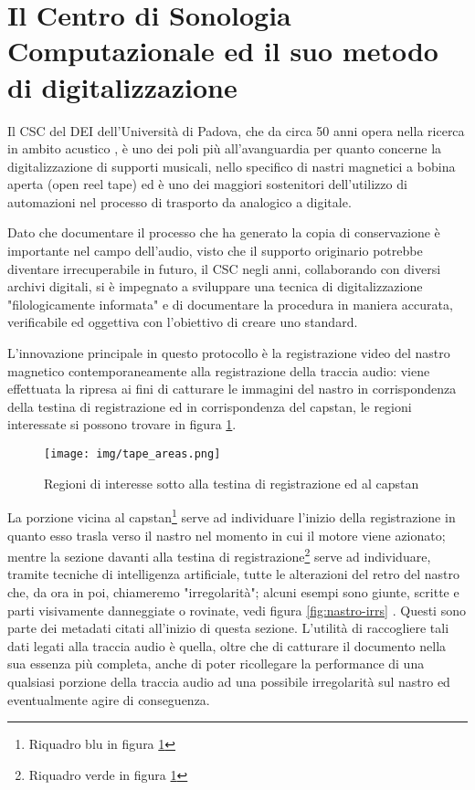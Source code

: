 \section{Il Centro di Sonologia Computazionale ed il suo metodo di digitalizzazione} \label{sec:csc-digitalizzazione}
Il \acf{CSC} del \acf{DEI} dell'Università di Padova, che da circa 50 anni opera nella ricerca in ambito acustico \cite{canazzaGestureMusicComputer2022}, è uno dei poli più all'avanguardia per quanto concerne la digitalizzazione di supporti musicali, nello specifico di nastri magnetici a bobina aperta (open reel tape) ed è uno dei maggiori sostenitori dell'utilizzo di automazioni nel processo di trasporto da analogico a digitale.

Dato che documentare il processo che ha generato la copia di conservazione è importante nel campo dell'audio, visto che il supporto originario potrebbe diventare irrecuperabile in futuro, il \ac{CSC} negli anni, collaborando con diversi archivi digitali, si è impegnato a sviluppare una tecnica di digitalizzazione "filologicamente informata" e di documentare la procedura in maniera accurata, verificabile ed oggettiva con l'obiettivo di creare uno standard.

L'innovazione principale in questo protocollo è la registrazione video del nastro magnetico contemporaneamente alla registrazione della traccia audio: viene effettuata la ripresa ai fini di catturare le immagini del nastro in corrispondenza della testina di registrazione ed in corrispondenza del capstan, le regioni interessate si possono trovare in figura \ref{fig:tape-areas}.

\begin{figure}[hb]
    \centering
    \texttt{[image: img/tape\_areas.png]}
    \caption{Regioni di interesse sotto alla testina di registrazione ed al capstan \cite{russoEnhancingPreservationRestoration2023}}
    \label{fig:tape-areas}
\end{figure}

La porzione vicina al capstan\footnote{Riquadro blu in figura \ref{fig:tape-areas}} serve ad individuare l'inizio della registrazione in quanto esso trasla verso il nastro nel momento in cui il motore viene azionato; mentre la sezione davanti alla testina di registrazione\footnote{Riquadro verde in figura \ref{fig:tape-areas}} serve ad individuare, tramite tecniche di intelligenza artificiale, tutte le alterazioni del retro del nastro che, da ora in poi, chiameremo "irregolarità"; alcuni esempi sono giunte, scritte e parti visivamente danneggiate o rovinate, vedi figura \ref{fig:nastro-irrs} \cite{gravaTesiVideoAnalyser2019}.
Questi sono parte dei metadati citati all'inizio di questa sezione.
L'utilità di raccogliere tali dati legati alla traccia audio è quella, oltre che di catturare il documento nella sua essenza più completa, anche di poter ricollegare la performance di una qualsiasi porzione della traccia audio ad una possibile irregolarità sul nastro ed eventualmente agire di conseguenza.

